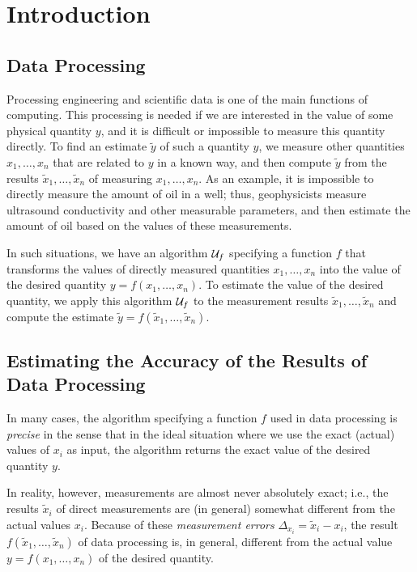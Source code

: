 \chapter{Introduction}

\section{Data Processing}

Processing engineering and scientific data is one of the main functions of 
computing.  This processing is needed if we are interested in the value of 
some physical quantity $y$, and it is difficult or impossible to
measure this quantity directly. To find an estimate $\tilde y$ of such a
quantity $y$, we measure other quantities $x_1,\ldots,x_n$ that are related
to $y$ in a known way, and then compute $\tilde y$ from the results $\tilde
x_1,\ldots,\tilde x_n$ of measuring $x_1,\ldots,x_n$. As an example, it
is impossible to directly measure the amount of oil in a well; thus,
geophysicists measure ultrasound conductivity and other measurable
parameters, and then estimate the amount of oil based on the values of
these measurements. 

In such situations, we have an algorithm ${\cal U}_f$ specifying a function $f$ 
that transforms the values of directly measured quantities $x_1,\ldots,x_n$ 
into the value of the desired quantity $y=f(x_1,\ldots,x_n)$.
To estimate the value of the desired quantity, we apply this algorithm 
${\cal U}_f$ to the measurement results $\tilde x_1,\ldots,\tilde x_n$ and 
compute the estimate $\tilde y=f(\tilde x_1,\ldots,\tilde x_n)$. 

\section{Estimating the Accuracy of the Results of Data Processing}

In many cases, the algorithm specifying a function $f$ used in data
processing is {\it precise} in the sense that in the ideal situation
where we use the exact (actual) values of $x_i$ as input, the algorithm
returns the exact value of the desired quantity $y$.

In reality, however, measurements are almost never absolutely exact; i.e.,
the results $\tilde x_i$ of direct measurements are (in general) somewhat
different from the actual values $x_i$.  Because of these {\em measurement
errors\/} $\Delta_{x_i}=\tilde x_i-x_i$, the result
$f(\tilde x_1,\ldots,\tilde x_n)$ of data processing is, in general,
different from the actual value $y=f(x_1,\ldots,x_n)$ of the desired quantity.

